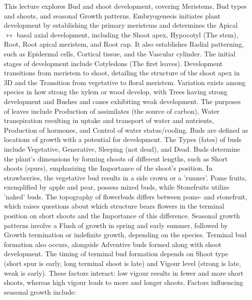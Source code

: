 \vspace{1em}
This lecture explores Bud and shoot development, covering Meristems, Bud types and shoots, and seasonal Growth patterns. Embryogenesis initiates plant development by establishing the primary meristems and determines the Apical $\leftrightarrow$ basal axial development, including the Shoot apex, Hypocotyl (The stem), Root, Root apical meristem, and Root cap. It also establishes Radial patterning, such as Epidermal cells, Cortical tissue, and the Vascular cylinder. The initial stages of development include Cotyledons (The first leaves). Development transitions from meristem to shoot, detailing the structure of the shoot apex in 3D and the Transition from vegetative to floral meristem. Variation exists among species in how strong the xylem or wood develop, with Trees having strong development and Bushes and canes exhibiting weak development. The purposes of leaves include Production of assimilates (the source of carbon), Water transpiration resulting in uptake and transport of water and nutrients, Production of hormones, and Control of water status/cooling.
Buds are defined as locations of growth with a potential for development. The Types (fates) of buds include Vegetative, Generative, Sleeping (not dead), and Dead. Buds determine the plant's dimensions by forming shoots of different lengths, such as Short shoots (spurs), emphasizing the Importance of the shoot's position. In strawberries, the vegetative bud results in a side crown or a 'runner'. Pome fruits, exemplified by apple and pear, possess mixed buds, while Stonefruits utilize 'naked' buds. The topography of flowerbuds differs between pome- and stonefruit, which raises questions about which structure bears flowers in the terminal position on short shoots and the Importance of this difference.
Seasonal growth patterns involve a Flush of growth in spring and early summer, followed by Growth termination or indefinite growth, depending on the species. Terminal bud formation also occurs, alongside Adventive buds formed along with shoot development. The timing of terminal bud formation depends on Shoot type (short spur is early, long terminal shoot is late) and Vigour level (strong is late, weak is early). These factors interact: low vigour results in fewer and more short shoots, whereas high vigour leads to more and longer shoots.
Factors influencing seasonal growth include: 

